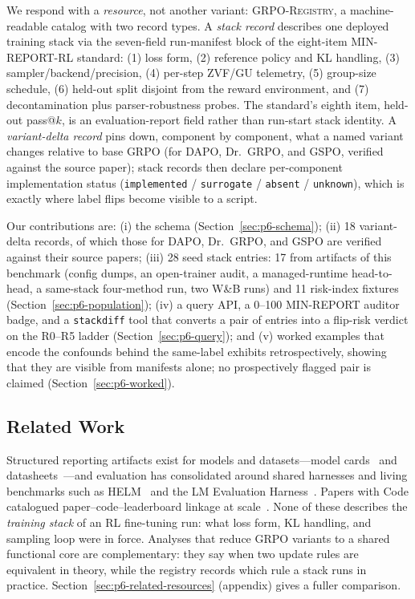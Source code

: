 We respond with a \emph{resource}, not another variant:
\textsc{GRPO-Registry}, a machine-readable catalog with two record types.
A \emph{stack record} describes one deployed training stack via the seven-field
run-manifest block of the eight-item MIN-REPORT-RL standard: (1) loss form, (2) reference policy
and KL handling, (3) sampler/backend/precision, (4) per-step ZVF/GU telemetry,
(5) group-size schedule, (6) held-out split disjoint from the reward
environment, and (7) decontamination plus parser-robustness probes. The
standard's eighth item, held-out pass@$k$, is an evaluation-report field rather
than run-start stack identity. A
\emph{variant-delta record} pins down, component by component, what a named
variant changes relative to base GRPO (for DAPO, Dr.~GRPO, and GSPO, verified
against the source paper); stack
records then declare per-component implementation status
(\texttt{implemented} / \texttt{surrogate} / \texttt{absent} / \texttt{unknown}),
which is exactly where label flips become visible to a script.

Our contributions are:
(i) the schema (Section~\ref{sec:p6-schema});
(ii) 18 variant-delta records, of which those for DAPO, Dr.~GRPO, and GSPO are
verified against their source papers;
(iii) 28 seed stack entries: 17 from artifacts of this benchmark (config
dumps, an open-trainer audit, a managed-runtime head-to-head, a same-stack
four-method run, two W\&B runs) and 11 risk-index fixtures
(Section~\ref{sec:p6-population});
(iv) a query API, a 0--100 MIN-REPORT auditor badge, and a \texttt{stackdiff}
tool that converts a pair of entries into a flip-risk verdict on the R0--R5
ladder (Section~\ref{sec:p6-query}); and
(v) worked examples that encode the confounds behind the same-label exhibits
retrospectively, showing that they are visible from manifests alone; no
prospectively flagged pair is claimed (Section~\ref{sec:p6-worked}).

\subsection{Related Work}
\label{sec:p6-related}
Structured reporting artifacts exist for models and
datasets---model cards~\citep{mitchell2019modelcards} and
datasheets~\citep{gebru2021datasheets}---and evaluation has consolidated around
shared harnesses and living benchmarks such as HELM~\citep{liang2022helm} and
the LM Evaluation Harness~\citep{gao2021harness, biderman2024lessons}. Papers
with Code catalogued paper--code--leaderboard linkage at
scale~\citep{paperswithcode2025}. None of these describes the \emph{training
stack} of an RL fine-tuning run: what loss form, KL handling, and sampling loop
were in force. Analyses that reduce GRPO variants to a shared functional core
\citep{wu2025grpodpo} are complementary: they say when two update
rules are equivalent in theory, while the registry records which rule a stack
runs in practice. Section~\ref{sec:p6-related-resources}\ifdefined\SUBMISSIONBUILD{} (appendix)\fi{} gives a fuller
comparison.
